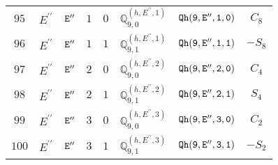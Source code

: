 \documentclass[fleqn,8pt]{jsarticle}
\begin{document}
\begin{table}[ht!]
\begin{center}
\begin{tabular}{cccccccc}
$ 95 $ & $ E^{\prime\prime} $ & $ {\tt E''} $ & $ 1 $ & $ 0 $ & $ \mathbb{Q}_{9,0}^{(h,E^{\prime\prime},1)} $ & $ {\tt Qh(9,E'',1,0)} $ & $ C_{8} $ \\
$ 96 $ & $ E^{\prime\prime} $ & $ {\tt E''} $ & $ 1 $ & $ 1 $ & $ \mathbb{Q}_{9,1}^{(h,E^{\prime\prime},1)} $ & $ {\tt Qh(9,E'',1,1)} $ & $ - S_{8} $ \\
$ 97 $ & $ E^{\prime\prime} $ & $ {\tt E''} $ & $ 2 $ & $ 0 $ & $ \mathbb{Q}_{9,0}^{(h,E^{\prime\prime},2)} $ & $ {\tt Qh(9,E'',2,0)} $ & $ C_{4} $ \\
$ 98 $ & $ E^{\prime\prime} $ & $ {\tt E''} $ & $ 2 $ & $ 1 $ & $ \mathbb{Q}_{9,1}^{(h,E^{\prime\prime},2)} $ & $ {\tt Qh(9,E'',2,1)} $ & $ S_{4} $ \\
$ 99 $ & $ E^{\prime\prime} $ & $ {\tt E''} $ & $ 3 $ & $ 0 $ & $ \mathbb{Q}_{9,0}^{(h,E^{\prime\prime},3)} $ & $ {\tt Qh(9,E'',3,0)} $ & $ C_{2} $ \\
$ 100 $ & $ E^{\prime\prime} $ & $ {\tt E''} $ & $ 3 $ & $ 1 $ & $ \mathbb{Q}_{9,1}^{(h,E^{\prime\prime},3)} $ & $ {\tt Qh(9,E'',3,1)} $ & $ - S_{2} $ \\
 \hline \hline
\end{tabular}
\end{center}
\end{table}
\end{document}
